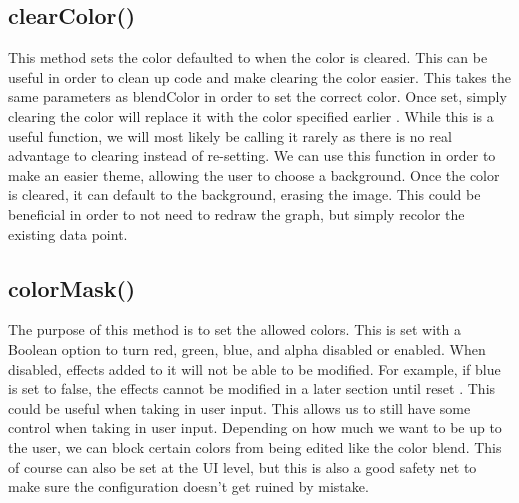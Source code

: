 \documentclass[letterpaper, 10pt] {article}
\begin{document}
\subsection{clearColor()}
This method sets the color defaulted to when the color is cleared. This can be useful in order to clean up code and make clearing the color easier. This takes the same parameters as blendColor in order to set the correct color. Once set, simply clearing the color will replace it with the color specified earlier \cite{clearcolor}.
While this is a useful function, we will most likely be calling it rarely as there is no real advantage to clearing instead of re-setting. We can use this function in order to make an easier theme, allowing the user to choose a background. Once the color is cleared, it can default to the background, erasing the image. This could be beneficial in order to not need to redraw the graph, but simply recolor the existing data point.
\subsection{colorMask()}
The purpose of this method is to set the allowed colors. This is set with a Boolean option to turn red, green, blue, and alpha disabled or enabled. When disabled, effects added to it will not be able to be modified. For example, if blue is set to false, the effects cannot be modified in a later section until reset \cite{colormask}.
This could be useful when taking in user input. This allows us to still have some control when taking in user input. Depending on how much we want to be up to the user, we can block certain colors from being edited like the color blend. This of course can also be set at the UI level, but this is also a good safety net to make sure the configuration doesn’t get ruined by mistake.
\end{document}
